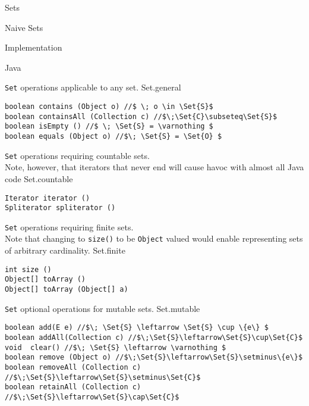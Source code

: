 \begin{plSection}{Sets}
\begin{plSection}{Naive Sets}
\begin{plSection}{Implementation}
\begin{plSection}{Java}
\begin{plListing}
{\texttt{Set}  operations applicable to any set.}
{Set.general}
\begin{lstlisting}
boolean contains (Object o) //$ \; o \in \Set{S}$
boolean containsAll (Collection c) //$\;\Set{C}\subseteq\Set{S}$ 
boolean isEmpty () //$ \; \Set{S} = \varnothing $
boolean equals (Object o) //$\; \Set{S} = \Set{O} $
\end{lstlisting}
\end{plListing}
\begin{plListing}
{\texttt{Set} operations requiring countable sets. \\
Note, however, that iterators that never end will cause 
havoc with almost all Java code}
{Set.countable}
\begin{lstlisting}
Iterator iterator ()
Spliterator spliterator ()
\end{lstlisting}
\end{plListing}
\begin{plListing}
{\texttt{Set} operations requiring finite sets. \\
Note that changing to \texttt{size()} to be \texttt{Object}
valued would enable representing sets
of arbitrary cardinality.}
{Set.finite}
\begin{lstlisting}
int size () 
Object[] toArray ()
Object[] toArray (Object[] a)
\end{lstlisting}
\end{plListing}
\begin{plListing}
{\texttt{Set} optional operations for mutable sets.}
{Set.mutable}
\begin{lstlisting}
boolean add(E e) //$\; \Set{S} \leftarrow \Set{S} \cup \{e\} $
boolean addAll(Collection c) //$\;\Set{S}\leftarrow\Set{S}\cup\Set{C}$ 
void  clear() //$\; \Set{S} \leftarrow \varnothing $ 
boolean remove (Object o) //$\;\Set{S}\leftarrow\Set{S}\setminus\{e\}$
boolean removeAll (Collection c) //$\;\Set{S}\leftarrow\Set{S}\setminus\Set{C}$ 
boolean retainAll (Collection c) //$\;\Set{S}\leftarrow\Set{S}\cap\Set{C}$
\end{lstlisting}
\end{plListing}


\end{plSection}
\end{plSection}
\end{plSection}
\end{plSection}
